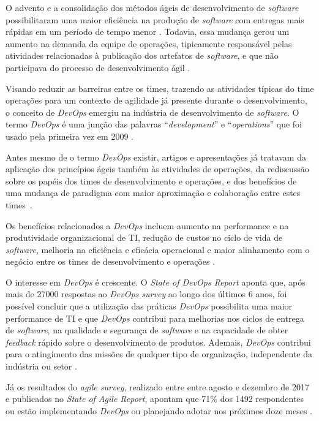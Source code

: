 O advento e a consolidação dos métodos ágeis de desenvolvimento de
\textit{software} possibilitaram uma maior eficiência na produção de
\textit{software} com entregas mais rápidas em um período de tempo menor
\cite{agile_sw_dev}. Todavia, essa mudança gerou um aumento na demanda da equipe de
operações, tipicamente responsável pelas atividades relacionadas à
publicação dos artefatos de \textit{software}, e que não participava
do processo de desenvolvimento ágil \cite{humble2010continuous}.

Visando reduzir as barreiras entre os times, trazendo as atividades típicas
do time operações para um contexto de agilidade já presente durante o
desenvolvimento, o conceito de \textit{DevOps} emergiu na indústria de
desenvolvimento de \textit{software}. O termo \textit{DevOps} é uma
junção das palavras ``\textit{development}'' e ``\textit{operations}'' que
foi usado pela primeira vez em 2009 \cite{devops_for_developers}.

Antes mesmo de o termo \textit{DevOps} existir, artigos e apresentações
já tratavam da aplicação dos princípios ágeis também às atividades de operações,
da rediscussão sobre os papéis dos times de desenvolvimento e operações, e dos
benefícios de uma mudança de paradigma com maior aproximação e colaboração
entre estes times~\cite{devops_for_developers,agile_infra_operations,flickr}.

Os benefícios relacionados a \textit{DevOps} incluem aumento na performance
e na produtividade organizacional de \acrshort{TI}, redução de custos no ciclo de vida
de \textit{software}, melhoria na eficiência e eficácia operacional e maior
alinhamento com o negócio entre os times de desenvolvimento e operações
\cite{characterizing_devops}.

O interesse em {\it DevOps} é crescente. O \textit{State of DevOps Report}
aponta que, após mais de 27000 respostas ao \textit{DevOps survey} ao longo dos
últimos 6 anos, foi possível concluir que a utilização das práticas \textit{DevOps}
possibilita uma maior performance de \acrshort{TI} e que \textit{DevOps} contribui para melhorias nos
ciclos de entrega de \textit{software}, na qualidade e segurança de \textit{software}
e na capacidade de obter \textit{feedback} rápido sobre o desenvolvimento de produtos.
Ademais, \textit{DevOps} contribui para o atingimento das missões de qualquer
tipo de organização, independente da indústria ou setor \cite{state_of_devops}.

Já os resultados do \textit{agile survey}, realizado entre entre agosto e dezembro
de 2017 e publicados no \textit{State of Agile Report}, apontam que 71\% dos 1492
respondentes ou estão implementando \textit{DevOps} ou planejando adotar nos
próximos doze meses \cite{state_of_agile}.


